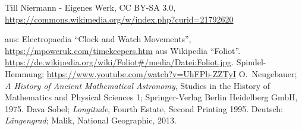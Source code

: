 \begin{thebibliography}{99}

Till Niermann - Eigenes Werk, CC BY-SA 3.0, \url{https://commons.wikimedia.org/w/index.php?curid=21792620}

 aus: Electropaedia ``Clock and Watch Movements'', 
           \url{https://mpoweruk.com/timekeepers.htm}
 aus Wikipedia ``Foliot''. \url{https://de.wikipedia.org/wiki/Foliot#/media/Datei:Foliot.jpg}.
 Spindel-Hemmung; \url{https://www.youtube.com/watch?v=UhFPb-ZZTyI}
 O.\ Neugebauer; \textit{A History of Ancient Mathematical Astronomy}, 
       Studies in the History of Mathematics and Physical Sciences 1; Springer-Verlag Berlin
       Heidelberg GmbH, 1975.
 Dava Sobel; \textit{Longitude}, Fourth Estate, Second Printing 1995. Deutsch: \textit{L\"angengrad};
                  Malik, National Geographic, 2013.        
\end{thebibliography}

%

